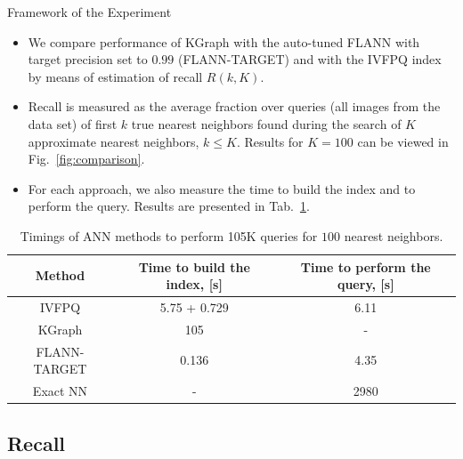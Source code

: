 \begin{frame}
	\begin{block}{Framework of the Experiment}
	\begin{itemize}
		\item We compare performance of KGraph with the auto-tuned FLANN with target precision set to $0.99$ (FLANN-TARGET) and with the IVFPQ index by means of estimation of recall $R(k, K)$.
		\item Recall is measured as the average fraction over queries (all images from the data set) of first $k$ true nearest neighbors found during the search of $K$ approximate nearest neighbors, $k \leq K$. Results for $K = 100$ can be viewed in Fig.~\ref{fig:comparison}.
		\item For each approach, we also measure the time to build the index and to perform the query. Results are presented in Tab.~\ref{tab:timings}.
	\end{itemize}

	\end{block}

\footnotesize{
\begin{table}
\centering
	\begin{tabular}{||c | c c ||} 
		\hline
		Method & Time to build the index, [s] & Time to perform the query, [s] \\ [0.5ex] 
		\hline\hline
		IVFPQ\footnotemark & 5.75 + 0.729 & 6.11  \\ 
		\hline
		KGraph & 105 & - \\
		\hline
		FLANN-TARGET & 0.136 & 4.35  \\
		\hline
		Exact NN & - & 2980  \\
		\hline
	\end{tabular}
	\caption{Timings of ANN methods to perform 105K queries for $100$ nearest neighbors.}
	\label{tab:timings}
\end{table}
}

\addtocounter{footnote}{-2}
\end{frame}


\subsection{Recall}

